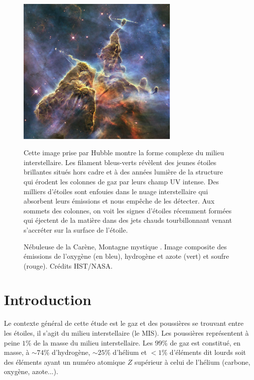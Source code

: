 \documentclass[11pt,a4paper]{article}
\begin{document}
\begin{spacing}{0.98}
\begin{figure}[!p]
    \centering
    \includegraphics[width = 0.7\textwidth]{figure/mystic.pdf}
    \caption{Nébuleuse de la Carène, \og Montagne mystique \fg{}. Image composite des émissions de l’oxygène (en bleu), hydrogène et azote (vert) et soufre (rouge). Crédits HST/NASA.}
    \vspace{1em}
    \begin{minipage}{\textwidth}
    Cette image prise par Hubble montre la forme complexe du milieu interstellaire. Les filament bleus-verts révèlent des jeunes étoiles brillantes situés hors cadre et à des années lumière de la structure qui érodent les colonnes de gaz par leurs champ UV intense. Des milliers d'étoiles sont enfouies dans le nuage interstellaire qui absorbent leurs émissions et nous empêche de les détecter. Aux sommets des colonnes, on voit les signes d'étoiles récemment formées qui éjectent de la matière dans des jets chauds tourbillonnant venant s'accréter sur la surface de l'étoile.
    \end{minipage}
    \label{fig:intro:mystic}
\end{figure}
 
\newpage 
\section*{Introduction}


Le contexte général de cette étude est le gaz et des poussières se trouvant entre les étoiles, il s'agit du milieu interstellaire (le MIS). Les poussières représentent à peine $1\%$ de la masse du milieu interstellaire. Les $99\%$ de gaz est constitué, en masse, à $\sim 74\%$ d'hydrogène, $\sim 25\%$ d'hélium et $<1\%$ d'éléments dit \og lourds \fg{} soit des éléments ayant un numéro atomique $Z$ supérieur à celui de l'hélium (carbone, oxygène, azote...).\newline 


\end{spacing}
\end{document}
